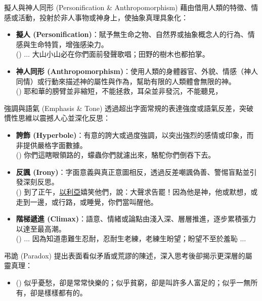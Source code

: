 \documentclass{beamer}
\begin{document}
\begin{frame}{擬人與神人同形 (Personification \& Anthropomorphism)}
  藉由借用人類的特徵、情感或活動，投射於非人事物或神身上，使抽象真理具象化：
  \begin{itemize}
    \item\textbf{擬人 (Personification)}：賦予無生命之物、自然界或抽象概念人的行為、情感與生命特質，增強感染力。\\
      () $\dots$ 大山小山必在你們面前發聲歌唱；田野的樹木也都拍掌。\\
    \item\textbf{神人同形 (Anthropomorphism)}：使用人類的身體器官、外貌、情感（神人同情）或行動來描述神的屬性與作為，幫助有限的人類體會無限的神。\\
      () 耶和華的膀臂並非縮短，不能拯救，耳朵並非發沉，不能聽見，\\
  \end{itemize}
\end{frame}

\begin{frame}{強調與語氣 (Emphasis \& Tone)}
  透過超出字面常規的表達強度或語氣反差，突破慣性思維以震撼人心並深化反思：
  \begin{itemize}
    \item\textbf{誇飾 (Hyperbole)}：有意的誇大或過度強調，以突出強烈的感情或印象，而非提供嚴格字面數據。\\
      ()  你們這瞎眼領路的，蠓蟲你們就濾出來，駱駝你們倒吞下去。
    \item\textbf{反諷 (Irony)}：字面意義與真正意圖相反，透過反差嘲諷偽善、警惕盲點並引發深刻反思。\\
      () 到了正午，\uline{以利亞}嬉笑他們，說：大聲求告罷！因為他是神，他或默想，或走到一邊，或行路，或睡覺，你們當叫醒他。
    \item\textbf{階梯遞進 (Climax)}：語意、情緒或論點由淺入深、層層推進，逐步累積張力以達至最高潮。\\
      () $\dots$ 因為知道患難生忍耐，忍耐生老練，老練生盼望；盼望不至於羞恥 $\dots$
  \end{itemize}
\end{frame}

\begin{frame}{弔詭 (Paradox)}
  提出表面看似矛盾或荒謬的陳述，深入思考後卻揭示更深層的屬靈真理：
  \begin{itemize}
    \item () 似乎憂愁，卻是常常快樂的；似乎貧窮，卻是叫許多人富足的；似乎一無所有，卻是樣樣都有的。
  \end{itemize}
\end{frame}
\end{document}
